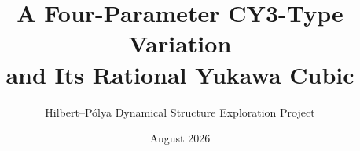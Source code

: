 \documentclass[11pt]{article}
\title{A Four-Parameter CY3-Type Variation\\
and Its Rational Yukawa Cubic}
\author{Hilbert--P\'olya Dynamical Structure Exploration Project}
\date{August 2026}
\theoremstyle{definition}
\theoremstyle{remark}
\begin{document}
\maketitle













\appendix




\begingroup
\raggedright


\endgroup
\end{document}
